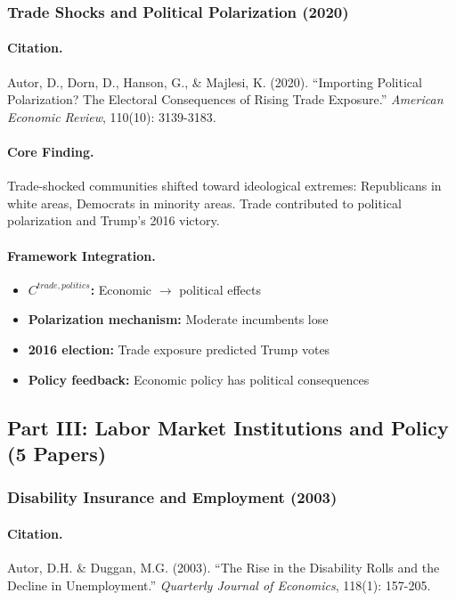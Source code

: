 \subsubsection{Trade Shocks and Political Polarization (2020)}

\paragraph{Citation.}
Autor, D., Dorn, D., Hanson, G., \& Majlesi, K. (2020). ``Importing
Political Polarization? The Electoral Consequences of Rising Trade Exposure.''
\emph{American Economic Review}, 110(10): 3139-3183.

\paragraph{Core Finding.}
Trade-shocked communities shifted toward ideological extremes: Republicans
in white areas, Democrats in minority areas. Trade contributed to
political polarization and Trump's 2016 victory.

\paragraph{Framework Integration.}
\begin{itemize}
  \item \textbf{$C^{trade,politics}$:} Economic $\to$ political effects
  \item \textbf{Polarization mechanism:} Moderate incumbents lose
  \item \textbf{2016 election:} Trade exposure predicted Trump votes
  \item \textbf{Policy feedback:} Economic policy has political consequences
\end{itemize}

\subsection{Part III: Labor Market Institutions and Policy (5 Papers)}

\subsubsection{Disability Insurance and Employment (2003)}

\paragraph{Citation.}
Autor, D.H. \& Duggan, M.G. (2003). ``The Rise in the Disability Rolls
and the Decline in Unemployment.''
\emph{Quarterly Journal of Economics}, 118(1): 157-205.

